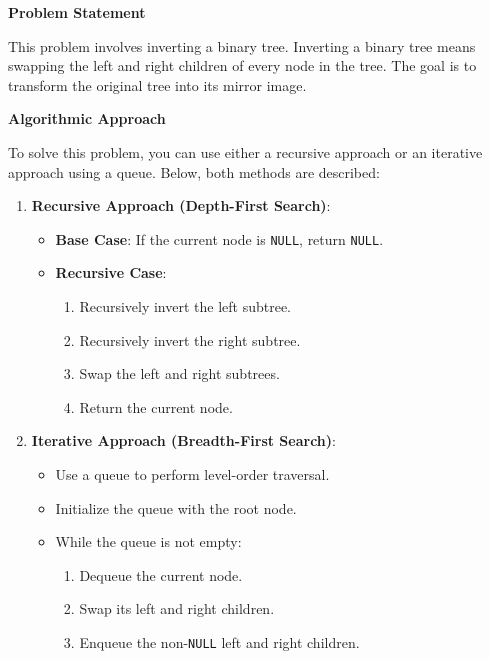 

\textbf{Problem Statement}

This problem involves inverting a binary tree. Inverting a binary tree means swapping the left and right children of every node in the tree. The goal is to transform the original tree into its mirror image.

\textbf{Algorithmic Approach}

To solve this problem, you can use either a recursive approach or an iterative approach using a queue. Below, both methods are described:

\begin{enumerate}
    \item \textbf{Recursive Approach (Depth-First Search)}:
    \begin{itemize}
        \item \textbf{Base Case}: If the current node is \texttt{NULL}, return \texttt{NULL}.
        \item \textbf{Recursive Case}: 
        \begin{enumerate}
            \item Recursively invert the left subtree.
            \item Recursively invert the right subtree.
            \item Swap the left and right subtrees.
            \item Return the current node.
        \end{enumerate}
    \end{itemize}
    
    \item \textbf{Iterative Approach (Breadth-First Search)}:
    \begin{itemize}
        \item Use a queue to perform level-order traversal.
        \item Initialize the queue with the root node.
        \item While the queue is not empty:
        \begin{enumerate}
            \item Dequeue the current node.
            \item Swap its left and right children.
            \item Enqueue the non-\texttt{NULL} left and right children.
        \end{enumerate}
    \end{itemize}
\end{enumerate}

